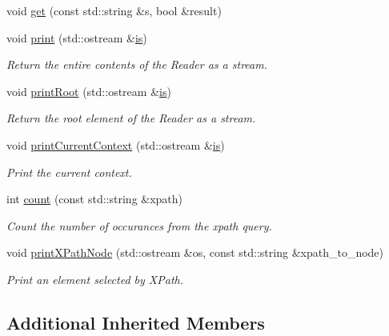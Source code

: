 \begin{DoxyCompactItemize}
\item 
void \mbox{\hyperlink{classADATXML_1_1XMLReader_ae3ba71a241315a5e90ba745fdc7e045b}{get}} (const std\+::string \&s, bool \&result)
\item 
void \mbox{\hyperlink{classADATXML_1_1XMLReader_a72513fe6f299e02428bdf4d225163f50}{print}} (std\+::ostream \&\mbox{\hyperlink{x_8cc_a81abbbdef81e25584a2eab888e643d3d}{is}})
\begin{DoxyCompactList}\small\item\em Return the entire contents of the Reader as a stream. \end{DoxyCompactList}\item 
void \mbox{\hyperlink{classADATXML_1_1XMLReader_a732a08c1605f8c01663105bb3586b575}{print\+Root}} (std\+::ostream \&\mbox{\hyperlink{x_8cc_a81abbbdef81e25584a2eab888e643d3d}{is}})
\begin{DoxyCompactList}\small\item\em Return the root element of the Reader as a stream. \end{DoxyCompactList}\item 
void \mbox{\hyperlink{classADATXML_1_1XMLReader_a424f9e30746b4fdc106b57b5ce95f7ec}{print\+Current\+Context}} (std\+::ostream \&\mbox{\hyperlink{x_8cc_a81abbbdef81e25584a2eab888e643d3d}{is}})
\begin{DoxyCompactList}\small\item\em Print the current context. \end{DoxyCompactList}\item 
int \mbox{\hyperlink{classADATXML_1_1XMLReader_a59584913f1338d956de60adef16a0718}{count}} (const std\+::string \&xpath)
\begin{DoxyCompactList}\small\item\em Count the number of occurances from the xpath query. \end{DoxyCompactList}\item 
void \mbox{\hyperlink{classADATXML_1_1XMLReader_ae1bbeacb282c3e9b33750d36aea11d32}{print\+X\+Path\+Node}} (std\+::ostream \&os, const std\+::string \&xpath\+\_\+to\+\_\+node)
\begin{DoxyCompactList}\small\item\em Print an element selected by X\+Path. \end{DoxyCompactList}\end{DoxyCompactItemize}
\subsection*{Additional Inherited Members}


